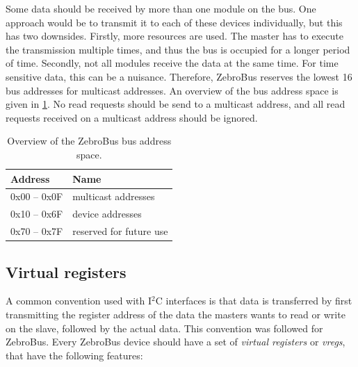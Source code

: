 Some data should be received by more than one module on the bus.
One approach would be to transmit it to each of these devices individually, but this has two downsides.
Firstly, more resources are used. The master has to execute the transmission multiple times, and thus the bus is occupied for a longer period of time.
Secondly, not all modules receive the data at the same time. For time sensitive data, this can be a nuisance.
Therefore, ZebroBus reserves the lowest 16 bus addresses for multicast addresses. An overview of the bus address space is given in \cref{tab:bus_address_space}. No read requests should be send to a multicast address, and all read requests received on a multicast address should be ignored.
\begin{table}[H]
    \begin{center}
    \caption{Overview of the ZebroBus bus address space.}
    \label{tab:bus_address_space}
    \begin{tabular}{ll}
    \toprule
    Address & Name \\ \midrule
    0x00 -- 0x0F & multicast addresses \\
    0x10 -- 0x6F & device addresses \\
    0x70 -- 0x7F & reserved for future use \\
    \bottomrule
    \end{tabular}
    \end{center}
\end{table}

\subsection{Virtual registers}
A common convention used with I$^2$C interfaces is that data is transferred by first transmitting the register address of the data the masters wants to read or write on the slave, followed by the actual data.
This convention was followed for ZebroBus.
Every ZebroBus device should have a set of \emph{virtual registers} or \emph{vregs}, that have the following features:

